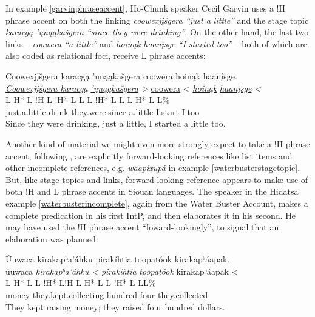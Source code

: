 \documentclass[output=paper]{LSP/langsci}
\begin{document}
In example \ref{garvinphraseaccent}, Ho-Chunk speaker Cecil Garvin uses a !H phrase accent on both the linking \emph{coowexjįšgera “just a little”} and the stage topic \emph{karacgą ’ųnąąkašgera “since they were drinking”}. On the other hand, the last two links -- \emph{coowera “a little”} and \emph{hoinąk	haanįsge “I started too”} -- both of which are also coded as relational foci, receive L phrase accents:

\ea\label{garvinphraseaccent}
 	Coowexjįšgera karacgą ’ųnąąkašgera coowera hoinąk haanįsge.\footnotemark\\
\glll	\emph{\underline{Coowexjįšgera	}}	\emph{\underline{karacgą}}	\emph{\underline{’ųnąąkašgera}	>}	{\underline{coowera} <}	\emph{\underline{hoinąk}}	\emph{\underline{haanįsge} <}\\
	{\ob L H* L !H\cb}				{\ob L !H* L}				{L\cb}	{\ob L !H* L L\cb}		{\ob L H* L}						{\hspaceThis{haanįs}\ob\hspaceThis{ }L\%}\\
	just.a.little					drink					they.were.since				a.little				I.start						I.too\\
\glt	Since they were drinking, just a little, I started a little too.
\z

Another kind of material we might even more strongly expect to take a !H phrase accent, following \citeauthor{PierrehumbertHirschberg1990}, are explicitly forward-looking references like list items and other incomplete references, e.g. \emph{waapixupá} in example \ref{waterbusterstagetopic}. But, like stage topics and links, forward-looking reference appears to make use of both !H and L phrase accents in Siouan languages. The speaker in the Hidatsa example \ref{waterbusterincomplete}, again from the Water Buster Account, makes a complete predication in his first IntP, and then elaborates it in his second. He may have used the !H phrase accent “foward-lookingly”, to signal that an elaboration was planned:

\ea\label{waterbusterincomplete}
 	Úuwaca kirakapʰa’áhku pirakíhtia toopatóok kirakapʰáapak.\footnotemark\\
\glll	úuwaca	\emph{kirakapʰa’áhku <}		\emph{pirakíhtia}	\emph{toopatóok}	{kirakapʰáapak <}\\
	{\ob L H* L}	{L !H* L!H\cb}	{\ob L H* L}		{}			{L !H* L L\cb{}L\%}\\
	money	they.kept.collecting			hundred		four			they.collected\\
\glt	They kept raising money; they raised four hundred dollars.
\z
\end{document}
